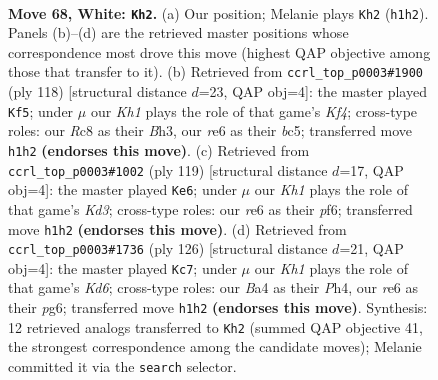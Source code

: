 \documentclass[11pt]{article}
\begin{document}
\clearpage

\begin{figure}[p]\centering
\begin{subfigure}{0.46\textwidth}\centering
\resizebox{\linewidth}{!}{%
\newchessgame
\chessboard[
  setfen={2R5/B6k/4r3/8/B3p2p/5p1P/b4P2/7K w - - 46 68},
  showmover=false,
  pgfstyle=straightmove, color=movearrow, markmove={h1-h2}
]}
\caption{}
\end{subfigure}\hfill
\begin{subfigure}{0.46\textwidth}\centering
\resizebox{\linewidth}{!}{%
\newchessgame
\chessboard[
  setfen={3k4/5p2/1p6/p1b1P3/P4K1p/1P5B/8/8 w - - 36 60},
  showmover=false,
  pgfstyle=straightmove, color=movearrow, markmove={f4-f5}
]}
\caption{}
\end{subfigure}
\\[4pt]
\begin{subfigure}{0.46\textwidth}\centering
\resizebox{\linewidth}{!}{%
\newchessgame
\chessboard[
  setfen={7B/7p/3k1P1P/8/p7/Pb1K4/1P6/8 b - - 18 60},
  showmover=false,
  pgfstyle=straightmove, color=movearrow, markmove={d6-e6}
]}
\caption{}
\end{subfigure}\hfill
\begin{subfigure}{0.46\textwidth}\centering
\resizebox{\linewidth}{!}{%
\newchessgame
\chessboard[
  setfen={3B4/1p6/1P1K2p1/5p1b/5P1P/1k6/8/8 w - - 10 64},
  showmover=false,
  pgfstyle=straightmove, color=movearrow, markmove={d6-c7}
]}
\caption{}
\end{subfigure}
\caption{\textbf{Move 68, White: \texttt{Kh2}.} (a) Our position; Melanie plays \texttt{Kh2} (\texttt{h1h2}). Panels (b)--(d) are the retrieved master positions whose correspondence most drove this move (highest QAP objective among those that transfer to it). (b) Retrieved from \texttt{ccrl\_top\_p0003\#1900} (ply 118) [structural distance $d$=23, QAP obj=4]: the master played \texttt{Kf5}; under $\mu$ our \emph{Kh1} plays the role of that game's \emph{Kf4}; cross-type roles: our \emph{R}c8 as their \emph{B}h3, our \emph{r}e6 as their \emph{b}c5; transferred move \texttt{h1h2} \textbf{(endorses this move)}. (c) Retrieved from \texttt{ccrl\_top\_p0003\#1002} (ply 119) [structural distance $d$=17, QAP obj=4]: the master played \texttt{Ke6}; under $\mu$ our \emph{Kh1} plays the role of that game's \emph{Kd3}; cross-type roles: our \emph{r}e6 as their \emph{p}f6; transferred move \texttt{h1h2} \textbf{(endorses this move)}. (d) Retrieved from \texttt{ccrl\_top\_p0003\#1736} (ply 126) [structural distance $d$=21, QAP obj=4]: the master played \texttt{Kc7}; under $\mu$ our \emph{Kh1} plays the role of that game's \emph{Kd6}; cross-type roles: our \emph{B}a4 as their \emph{P}h4, our \emph{r}e6 as their \emph{p}g6; transferred move \texttt{h1h2} \textbf{(endorses this move)}. Synthesis: 12 retrieved analogs transferred to \texttt{Kh2} (summed QAP objective 41, the strongest correspondence among the candidate moves); Melanie committed it via the \texttt{search} selector.}
\label{fig:thought-m134}
\end{figure}
\end{document}
